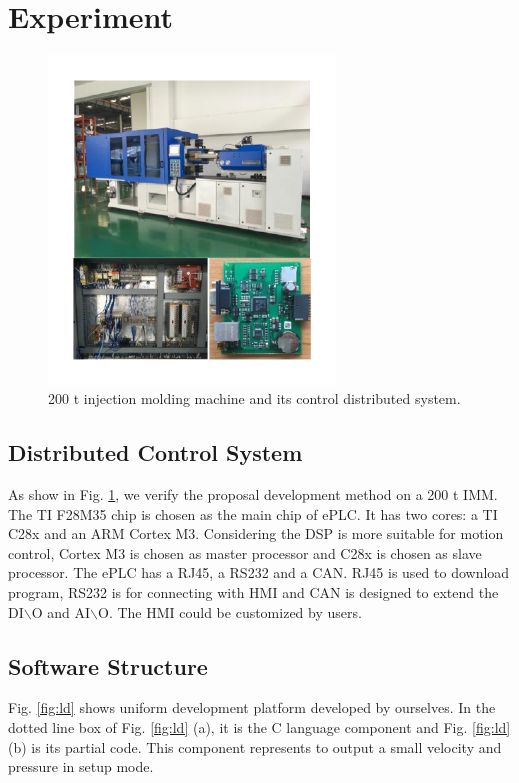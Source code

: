 \documentclass[journal,UTF8]{IEEEtran}
\begin{document}
\section{Experiment}
\label{Experiment}

\begin{figure}
	\centering
	\includegraphics[width=3in]{fig/FIG10.pdf}
	\caption{200 t injection molding machine and its control distributed system.}
	\label{fig:IMM}
\end{figure}

\subsection{Distributed Control System}
As show in Fig. \ref{fig:IMM}, we verify the proposal development method on a 200 t IMM. The TI F28M35 chip is chosen as the main chip of ePLC. It has two cores: a TI C28x and an ARM Cortex M3. Considering the DSP is more suitable for motion control, Cortex M3 is chosen as master processor and C28x is chosen as slave processor. The ePLC has a RJ45, a RS232 and a CAN. RJ45 is used to download program, RS232 is for connecting with HMI and CAN is designed to extend the DI$\backslash$O and AI$\backslash$O. The HMI could be customized by users.

\subsection{Software Structure}
Fig. \ref{fig:ld} shows uniform development platform developed by ourselves. In the dotted line box of Fig. \ref{fig:ld} (a), it is the C language component and Fig. \ref{fig:ld} (b) is its partial code. This component represents to output a small velocity and pressure in setup mode.
\end{document}
